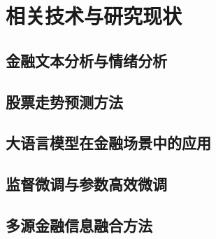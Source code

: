
\chapter{相关技术与研究现状}

\section{金融文本分析与情绪分析}

\section{股票走势预测方法}

\section{大语言模型在金融场景中的应用}

\section{监督微调与参数高效微调}

\section{多源金融信息融合方法}
